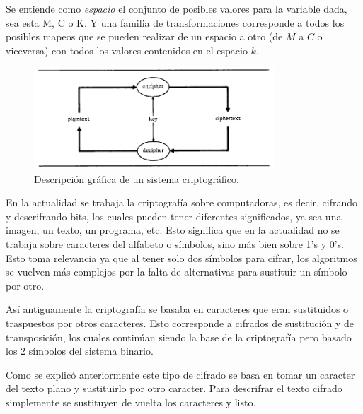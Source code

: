 Se entiende como \textit{espacio} el conjunto de posibles valores para la variable dada, sea esta M, C o K.
Y una familia de transformaciones corresponde a todos los posibles mapeos que se pueden realizar de un espacio a otro (de $M$ a $C$ o viceversa) con todos los valores contenidos en el espacio $k$.

\begin{figure}
	\centering
	\includegraphics[width=0.8\textwidth]{./images/figExplicacionSistemaCripto}
	\caption{Descripción gráfica de un sistema criptográfico.}
	\label{figExplicacionSistemaCripto}
\end{figure}


En la actualidad se trabaja la criptografía sobre computadoras, es decir, cifrando y descrifrando bits, los cuales pueden tener diferentes significados, ya sea una imagen, un texto, un programa, etc. Esto significa que en la actualidad no se trabaja sobre caracteres del alfabeto o símbolos, sino más bien sobre 1's y 0's. Esto toma relevancia ya que al tener solo dos símbolos para cifrar, los algoritmos se vuelven más complejos por la falta de alternativas para sustituir un símbolo por otro.

Así antiguamente la criptografía se basaba en caracteres que eran sustituidos o traspuestos por otros caracteres. Esto corresponde a cifrados de sustitución y de transposición, los cuales continúan siendo la base de la criptografía pero basado los 2 símbolos del sistema binario.

Como se explicó anteriormente este tipo de cifrado se basa en tomar un caracter del texto plano y sustituirlo por otro caracter. Para descrifrar el texto cifrado simplemente se sustituyen de vuelta los caracteres y listo.

